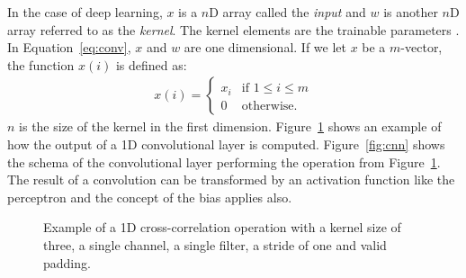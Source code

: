 \documentclass[]{article}
\begin{document}
In the case of deep learning, $x$ is a $n$D array called the
\textit{input} and $w$ is another $n$D array referred to as the
\textit{kernel}. The kernel elements are the trainable parameters
\citep{goodfellow_et_al_2016}.
In Equation~\ref{eq:conv}, $x$ and $w$ are one dimensional.
If we let $x$ be a $m$-vector, the function $x(i)$ is defined as:
\begin{align}
  \label{eq:valid_conv}
  x(i) = \begin{cases}
    x_i &\text{if } 1 \leq i \leq m \\
    0 &\text{otherwise.}
  \end{cases}
\end{align}
$n$ is the size of the kernel in the first dimension.
Figure~\ref{fig:conv_op} shows an example of how the output of a
1D convolutional layer is computed.
Figure~\ref{fig:cnn} shows the schema of the convolutional
layer performing the operation from Figure~\ref{fig:conv_op}.
The result of a convolution can be transformed by an activation
function like the perceptron and the concept of the bias applies also.

\begin{figure}
\begin{center}
\end{center}
\caption{Example of a 1D cross-correlation operation with a kernel
  size of three, a single channel, a single filter, a stride of one
  and valid padding.}
\label{fig:conv_op}
\end{figure}
\end{document}
